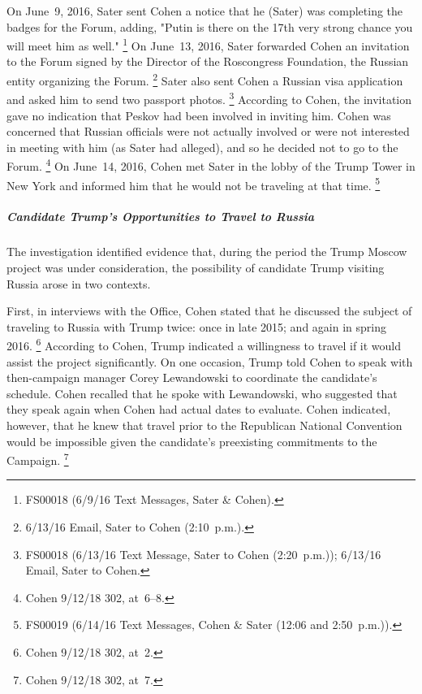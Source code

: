 On June~9, 2016, Sater sent Cohen a notice that he (Sater) was completing the badges for the Forum, adding, "Putin is there on the 17th very strong chance you will meet him as well."%
\footnote{FS00018 (6/9/16 Text Messages, Sater \& Cohen).}
On June~13, 2016, Sater forwarded Cohen an invitation to the Forum signed by the Director of the Roscongress Foundation, the Russian entity organizing the Forum.%
\footnote{6/13/16 Email, Sater to Cohen (2:10~p.m.).}
Sater also sent Cohen a Russian visa application and asked him to send two passport photos.%
\footnote{FS00018 (6/13/16 Text Message, Sater to Cohen (2:20~p.m.));
6/13/16 Email, Sater to Cohen.}
According to Cohen, the invitation gave no indication that Peskov had been involved in inviting him.
Cohen was concerned that Russian officials were not actually involved or were not interested in meeting with him (as Sater had alleged), and so he decided not to go to the Forum.%
\footnote{Cohen 9/12/18 302, at~6--8.}
On June~14, 2016, Cohen met Sater in the lobby of the Trump Tower in New York and informed him that he would not be traveling at that time.%
\footnote{FS00019 (6/14/16 Text Messages, Cohen \& Sater (12:06 and 2:50~p.m.)).}

\subparagraph{Candidate Trump's Opportunities to Travel to Russia}

The investigation identified evidence that, during the period the Trump Moscow project was under consideration, the possibility of candidate Trump visiting Russia arose in two contexts.

First, in interviews with the Office, Cohen stated that he discussed the subject of traveling to Russia with Trump twice: once in late 2015; and again in spring 2016.%
\footnote{Cohen 9/12/18 302, at~2.}
According to Cohen, Trump indicated a willingness to travel if it would assist the project significantly.
On one occasion, Trump told Cohen to speak with then-campaign manager Corey Lewandowski to coordinate the candidate's schedule.
Cohen recalled that he spoke with Lewandowski, who suggested that they speak again when Cohen had actual dates to evaluate.
Cohen indicated, however, that he knew that travel prior to the Republican National Convention would be impossible given the candidate's preexisting commitments to the Campaign.%
\footnote{Cohen 9/12/18 302, at~7.}

